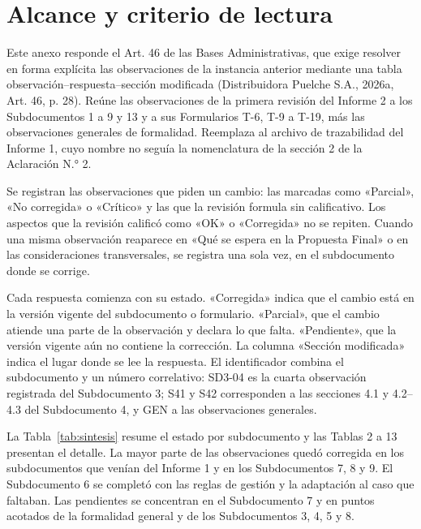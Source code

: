 \documentclass[carta,firma]{lafrox}
\begin{document}
\portadalafrox
\indicelafrox

\section{Alcance y criterio de lectura}

Este anexo responde el Art. 46 de las Bases Administrativas, que exige resolver en forma explícita las observaciones de la instancia anterior mediante una tabla observación–respuesta–sección modificada (Distribuidora Puelche S.A., 2026a, Art. 46, p. 28). Reúne las observaciones de la primera revisión del Informe 2 a los Subdocumentos 1 a 9 y 13 y a sus Formularios T-6, T-9 a T-19, más las observaciones generales de formalidad. Reemplaza al archivo de trazabilidad del Informe 1, cuyo nombre no seguía la nomenclatura de la sección 2 de la Aclaración N.° 2.

Se registran las observaciones que piden un cambio: las marcadas como «Parcial», «No corregida» o «Crítico» y las que la revisión formula sin calificativo. Los aspectos que la revisión calificó como «OK» o «Corregida» no se repiten. Cuando una misma observación reaparece en «Qué se espera en la Propuesta Final» o en las consideraciones transversales, se registra una sola vez, en el subdocumento donde se corrige.

Cada respuesta comienza con su estado. «Corregida» indica que el cambio está en la versión vigente del subdocumento o formulario. «Parcial», que el cambio atiende una parte de la observación y declara lo que falta. «Pendiente», que la versión vigente aún no contiene la corrección. La columna «Sección modificada» indica el lugar donde se lee la respuesta. El identificador combina el subdocumento y un número correlativo: SD3-04 es la cuarta observación registrada del Subdocumento 3; S41 y S42 corresponden a las secciones 4.1 y 4.2–4.3 del Subdocumento 4, y GEN a las observaciones generales.

La Tabla~\ref{tab:sintesis} resume el estado por subdocumento y las Tablas 2 a 13 presentan el detalle. La mayor parte de las observaciones quedó corregida en los subdocumentos que venían del Informe 1 y en los Subdocumentos 7, 8 y 9. El Subdocumento 6 se completó con las reglas de gestión y la adaptación al caso que faltaban. Las pendientes se concentran en el Subdocumento 7 y en puntos acotados de la formalidad general y de los Subdocumentos 3, 4, 5 y 8.


\end{document}
